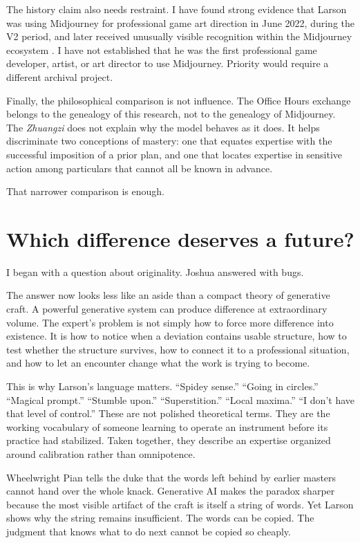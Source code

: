 \documentclass[11pt]{article}
\begin{document}
The history claim also needs restraint. I have found strong evidence that Larson was using Midjourney for professional game art direction in June 2022, during the V2 period, and later received unusually visible recognition within the Midjourney ecosystem \cite{AIArtWeeklyLarson2023,MidjourneyLegacy}. I have not established that he was the first professional game developer, artist, or art director to use Midjourney. Priority would require a different archival project.

Finally, the philosophical comparison is not influence. The Office Hours exchange belongs to the genealogy of this research, not to the genealogy of Midjourney. The \emph{Zhuangzi} does not explain why the model behaves as it does. It helps discriminate two conceptions of mastery: one that equates expertise with the successful imposition of a prior plan, and one that locates expertise in sensitive action among particulars that cannot all be known in advance.

That narrower comparison is enough.

\section{Which difference deserves a future?}
I began with a question about originality. Joshua answered with bugs.

The answer now looks less like an aside than a compact theory of generative craft. A powerful generative system can produce difference at extraordinary volume. The expert's problem is not simply how to force more difference into existence. It is how to notice when a deviation contains usable structure, how to test whether the structure survives, how to connect it to a professional situation, and how to let an encounter change what the work is trying to become.

This is why Larson's language matters. ``Spidey sense.'' ``Going in circles.'' ``Magical prompt.'' ``Stumble upon.'' ``Superstition.'' ``Local maxima.'' ``I don't have that level of control.'' These are not polished theoretical terms. They are the working vocabulary of someone learning to operate an instrument before its practice had stabilized. Taken together, they describe an expertise organized around calibration rather than omnipotence.

Wheelwright Pian tells the duke that the words left behind by earlier masters cannot hand over the whole knack. Generative AI makes the paradox sharper because the most visible artifact of the craft is itself a string of words. Yet Larson shows why the string remains insufficient. The words can be copied. The judgment that knows what to do next cannot be copied so cheaply.
\end{document}

